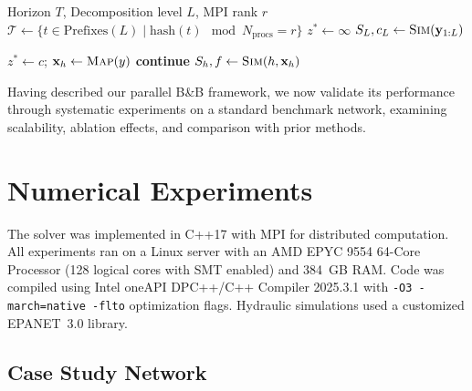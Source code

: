\documentclass[a4paper,fleqn]{cas-dc}
\begin{document}
\begin{algorithm}
	\footnotesize
	\caption{Parallel Branch-and-Bound}
	\label{alg:bb_solver}
	\begin{algorithmic}[1]
		\Require Horizon $T$, Decomposition level $L$, MPI rank $r$
		\State $\mathcal{T} \gets \{t \in \text{Prefixes}(L) \mid \text{hash}(t) \mod N_{\text{procs}} = r\}$
		\State $z^* \gets \infty$
		\State $S_L, c_L \gets \Call{Sim}{\mathbf{y}_{1:L}}$
		  \EndIf
		\State {} 
		\EndFor

		 \Return \EndIf
		 $z^* \gets c$;  \EndIf
		\Return
		\EndIf
		 
		\State $\mathbf{x}_h \gets \Call{Map}{y}$
		 \textbf{continue} \EndIf
		\State $S_h, f \gets \Call{Sim}{h, \mathbf{x}_h}$
		\State {}
		\State {}
		\EndIf
		\State {}
		\EndFor
		\EndProcedure
	\end{algorithmic}
\end{algorithm}

Having described our parallel B\&B framework, we now validate its performance through systematic experiments on a standard benchmark network, examining scalability, ablation effects, and comparison with prior methods.

\section{Numerical Experiments}

The solver was implemented in C++17 with MPI for distributed computation. All experiments ran on a Linux server with an AMD EPYC 9554 64-Core Processor (128 logical cores with SMT enabled) and 384~GB RAM. Code was compiled using Intel oneAPI DPC++/C++ Compiler 2025.3.1 with \texttt{-O3 -march=native -flto} optimization flags. Hydraulic simulations used a customized EPANET~3.0 library.

\subsection{Case Study Network}
\end{document}
